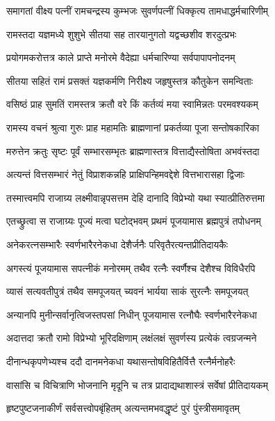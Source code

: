 \twolineshloka
{समागतां वीक्ष्य पत्नीं रामचन्द्रस्य कुम्भजः}
{सुवर्णपत्नीं धिक्कृत्य तामधाद्धर्मचारिणीम्}%

\twolineshloka
{रामस्तदा यज्ञमध्ये शुशुभे सीतया सह}
{तारयानुगतो यद्वच्छशीव शरदुत्प्रभः}%

\twolineshloka
{प्रयोगमकरोत्तत्र काले प्राप्ते मनोरमे}
{वैदेह्या धर्मचारिण्या सर्वपापापनोदनम्}%

\twolineshloka
{सीतया सहितं रामं प्रसक्तं यज्ञकर्मणि}
{निरीक्ष्य जहृषुस्तत्र कौतुकेन समन्विताः}%

\twolineshloka
{वसिष्ठं प्राह सुमतिं रामस्तत्र क्रतौ वरे}
{किं कर्तव्यं मया स्वामिन्नतः परमवश्यकम्}%

\twolineshloka
{रामस्य वचनं श्रुत्वा गुरुः प्राह महामतिः}
{ब्राह्मणानां प्रकर्तव्या पूजा सन्तोषकारिका}%

\twolineshloka
{मरुत्तेन क्रतुः सृष्टः पूर्वं सम्भारसम्भृतः}
{ब्राह्मणास्तत्र वित्ताद्यैस्तोषिता अभवंस्तदा}%

\twolineshloka
{अत्यन्तं वित्तसम्भारं नेतुं विप्राशकन्नहि}
{प्राक्षिपन्हिमवद्देशे वित्तभारासहा द्विजाः}%

\twolineshloka
{तस्मात्त्वमपि राजाग्र्य लक्ष्मीवान्नृपसत्तम}
{देहि दानादि विप्रेभ्यो यथा स्यात्प्रीतिरुत्तमा}%

\twolineshloka
{एतच्छ्रुत्वा स राजाग्र्यः पूज्यं मत्वा घटोद्भवम्}
{प्रथमं पूजयामास ब्रह्मपुत्रं तपोधनम्}%

\twolineshloka
{अनेकरत्नसम्भारैः स्वर्णभारैरनेकधा}
{देशैर्जनैः परिवृतैरत्यन्तप्रीतिदायकैः}%

\twolineshloka
{अगस्त्यं पूजयामास सपत्नीकं मनोरमम्}
{तथैव रत्नैः स्वर्णैश्च देशैश्च विविधैरपि}%

\twolineshloka
{व्यासं सत्यवतीपुत्रं तथैव समपूजयत्}
{च्यवनं भार्यया साकं सुरत्नैः समपूजयत्}%

\twolineshloka
{अन्यानपि मुनीन्सर्वानृत्विजस्तपसां निधीन्}
{पूजयामास रत्नौघैः स्वर्णभारैरनेकधा}%

\twolineshloka
{अदात्तदा क्रतौ रामो विप्रेभ्यो भूरिदक्षिणाम्}
{लक्षंलक्षं सुवर्णस्य प्रत्येकं त्वग्रजन्मने}%

\twolineshloka
{दीनान्धकृपणेभ्यश्च ददौ दानमनेकधा}
{यथासन्तोषविहितैर्वित्तै रत्नैर्मनोहरैः}%

\twolineshloka
{वासांसि च विचित्राणि भोजनानि मृदूनि च}
{तत्र प्रादाद्यथाशास्त्रं सर्वेषां प्रीतिदायकम्}%

\twolineshloka
{हृष्टपुष्टजनाकीर्णं सर्वसत्त्वोपबृंहितम्}
{अत्यन्तमभवद्धृष्टं पुरं पुंस्त्रीसमावृतम्}%

